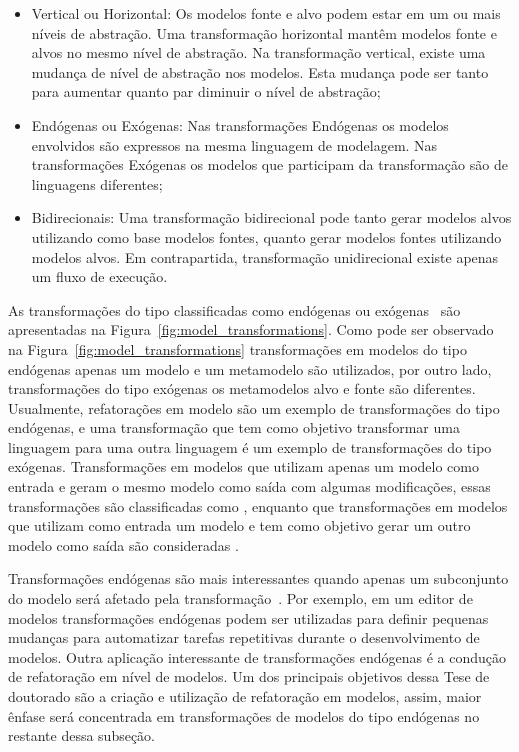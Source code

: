 \begin{itemize}
	\item Vertical ou Horizontal: Os modelos fonte e alvo podem estar em um ou mais níveis de abstração. Uma transformação horizontal mantêm modelos fonte e alvos no mesmo nível de abstração. Na transformação vertical, existe uma mudança de nível de abstração nos modelos. Esta mudança pode ser tanto para aumentar quanto par diminuir o nível de abstração;
	\item  Endógenas ou Exógenas: Nas transformações Endógenas os modelos envolvidos são expressos na mesma linguagem de modelagem. Nas transformações Exógenas os modelos que participam da transformação são de linguagens diferentes;
	\item Bidirecionais: Uma transformação bidirecional pode tanto gerar modelos alvos utilizando como base modelos fontes, quanto gerar modelos fontes utilizando modelos alvos. Em contrapartida, transformação unidirecional existe apenas um fluxo de execução. 
\end{itemize}

As transformações do tipo classificadas como endógenas ou exógenas~\cite{Brambilla_2012} são apresentadas na Figura~\ref{fig:model_transformations}. Como pode ser observado na Figura~\ref{fig:model_transformations} transformações em modelos do tipo endógenas apenas um modelo e um metamodelo são utilizados, por outro lado, transformações do tipo exógenas os metamodelos alvo e fonte são diferentes. Usualmente, refatorações em modelo são um exemplo de transformações do tipo endógenas, e uma transformação que tem como objetivo transformar uma linguagem para uma outra linguagem é um exemplo de transformações do tipo exógenas. Transformações em modelos que utilizam apenas um modelo como entrada e geram o mesmo modelo como saída com algumas modificações, essas transformações são classificadas como , enquanto que transformações em modelos que utilizam como entrada um modelo e tem como objetivo gerar um outro modelo como saída são consideradas . 

Transformações endógenas são mais interessantes quando apenas um subconjunto do modelo será afetado pela transformação~\cite{Brambilla_2012}. Por exemplo, em um editor de modelos transformações endógenas podem ser utilizadas para definir pequenas mudanças para automatizar tarefas repetitivas durante o desenvolvimento de modelos. Outra aplicação interessante de transformações endógenas é a condução de refatoração em nível de modelos. Um dos principais objetivos dessa Tese de doutorado são a criação e utilização de refatoração em modelos, assim, maior ênfase será concentrada em transformações de modelos do tipo endógenas no restante dessa subseção.


